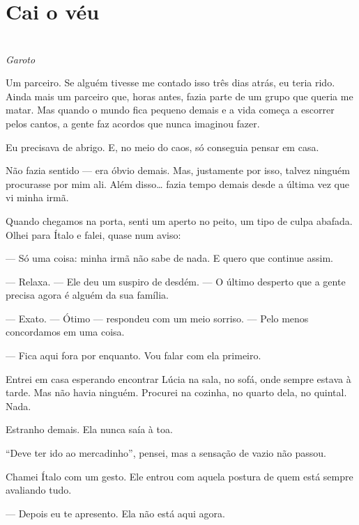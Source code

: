 \newpage

\ifdefined\useChapters
\chapter{Cai o véu}
\else
\chapter{}
\fi

\begin{center}
\textit{Garoto}
\end{center}

Um parceiro.  
Se alguém tivesse me contado isso três dias atrás, eu teria rido.  
Ainda mais um parceiro que, horas antes, fazia parte de um grupo que queria me matar.  
Mas quando o mundo fica pequeno demais e a vida começa a escorrer pelos cantos, a gente faz acordos que nunca imaginou fazer.

Eu precisava de abrigo.  
E, no meio do caos, só conseguia pensar em casa.

Não fazia sentido — era óbvio demais.  
Mas, justamente por isso, talvez ninguém procurasse por mim ali.  
Além disso… fazia tempo demais desde a última vez que vi minha irmã.

Quando chegamos na porta, senti um aperto no peito, um tipo de culpa abafada.  
Olhei para Ítalo e falei, quase num aviso:

— Só uma coisa: minha irmã não sabe de nada. E quero que continue assim.

— Relaxa. — Ele deu um suspiro de desdém. — O último desperto que a gente precisa agora é alguém da sua família.

— Exato.  
— Ótimo — respondeu com um meio sorriso. — Pelo menos concordamos em uma coisa.

— Fica aqui fora por enquanto. Vou falar com ela primeiro.

Entrei em casa esperando encontrar Lúcia na sala, no sofá, onde sempre estava à tarde.  
Mas não havia ninguém.  
Procurei na cozinha, no quarto dela, no quintal.  
Nada.

Estranho demais. Ela nunca saía à toa.

“Deve ter ido ao mercadinho”, pensei, mas a sensação de vazio não passou.

Chamei Ítalo com um gesto.  
Ele entrou com aquela postura de quem está sempre avaliando tudo.

— Depois eu te apresento. Ela não está aqui agora.

